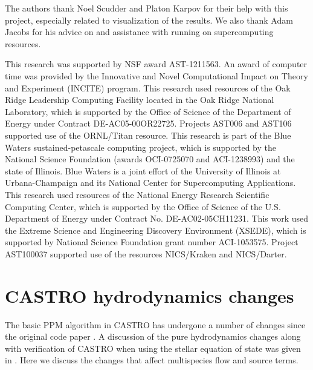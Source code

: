 \documentclass{emulateapj}
\begin{document}
\acknowledgments

The authors thank Noel Scudder and Platon Karpov for their help with 
this project, especially related to visualization of the results. 
We also thank Adam Jacobs for his advice on and assistance with 
running on supercomputing resources.

This research was supported by NSF award AST-1211563. An
award of computer time was provided by the Innovative and Novel
Computational Impact on Theory and Experiment (INCITE) program.  This
research used resources of the Oak Ridge Leadership Computing Facility
located in the Oak Ridge National Laboratory, which is supported by
the Office of Science of the Department of Energy under Contract
DE-AC05-00OR22725. Projects AST006 and AST106 supported use of the ORNL/Titan resource. 
This research is part of the Blue Waters sustained-petascale computing project, 
which is supported by the National Science Foundation (awards OCI-0725070 
and ACI-1238993) and the state of Illinois. Blue Waters is a joint 
effort of the University of Illinois at Urbana-Champaign and its 
National Center for Supercomputing Applications.
This research used resources of the National Energy Research Scientific Computing
Center, which is supported by the Office of Science of the
U.S. Department of Energy under Contract No. DE-AC02-05CH11231.  
This work used the Extreme Science and Engineering Discovery Environment (XSEDE), 
which is supported by National Science Foundation grant number ACI-1053575. 
Project AST100037 supported use of the resources NICS/Kraken and NICS/Darter.

\clearpage





\clearpage
\appendix

\section{CASTRO hydrodynamics changes}

The basic PPM algorithm in CASTRO has undergone a number of changes
since the original code paper \citep{castro}.  A discussion of the
pure hydrodynamics changes along with verification of CASTRO when
using the stellar equation of state was given in
\citet{zingalekatz:2015}.  Here we discuss the changes that affect
multispecies flow and source terms.
\end{document}

